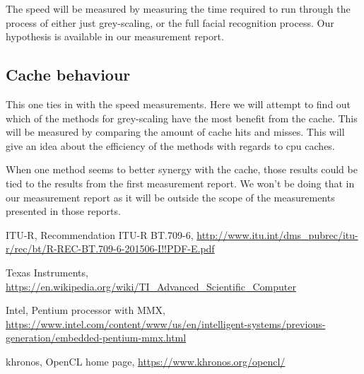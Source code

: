 \documentclass[a4paper]{article}
\begin{document}
The speed will be measured by measuring the time required to run through the process of either just grey-scaling, or the full facial recognition process. Our hypothesis is available in our measurement report.

\subsection{Cache behaviour}
This one ties in with the speed measurements. Here we will attempt to find out which of the methods for grey-scaling have the most benefit from the cache. This will be measured by comparing the amount of cache hits and misses. This will give an idea about the efficiency of the methods with regards to cpu caches.

When one method seems to better synergy with the cache, those results could be tied to the results from the first measurement report. We won't be doing that in our measurement report as it will be outside the scope of the measurements presented in those reports.

\begin{thebibliography}{9}

	ITU-R,
	Recommendation  ITU-R  BT.709-6,	
	\url{http://www.itu.int/dms_pubrec/itu-r/rec/bt/R-REC-BT.709-6-201506-I!!PDF-E.pdf}
  
	Texas Instruments,
	\url{https://en.wikipedia.org/wiki/TI_Advanced_Scientific_Computer}
 
Intel,
Pentium processor with MMX,
\url{https://www.intel.com/content/www/us/en/intelligent-systems/previous-generation/embedded-pentium-mmx.html}

khronos,
OpenCL home page,
\url{https://www.khronos.org/opencl/}

\end{thebibliography}
\end{document}
